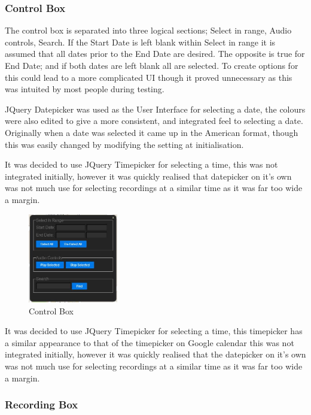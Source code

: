 \documentclass{l3proj}
\begin{document}
\subsubsection{Control Box}

The control box is separated into three logical sections; Select in range, Audio controls, Search. If the Start Date is left blank within Select in range it is assumed that all dates prior to the End Date are desired. The opposite is true for End Date; and if both dates are left blank all are selected. To create options for this could lead to a more complicated UI though it proved unnecessary as this was intuited by most people during testing.

JQuery Datepicker was used as the User Interface for selecting a date, the colours were also edited to give a more consistent, and integrated feel to selecting a date. Originally when a date was selected it came up in the American format, though this was easily changed by modifying the setting at initialisation.

It was decided to use JQuery Timepicker for selecting a time, this was not integrated initially, however it was quickly realised that datepicker on it's own was not much use for selecting recordings at a similar time as it was far too wide a margin.

\begin{figure}[ht!]
\centering
\includegraphics[width=0.35\textwidth]{images/ctrl-box.jpg}
\caption{Control Box}
\end{figure}

It was decided to use JQuery Timepicker for selecting a time, this timepicker has a similar appearance to that of the timepicker on Google calendar this was not integrated initially, however it was quickly realised that the datepicker on it's own was not much use for selecting recordings at a similar time as it was far too wide a margin.

\subsubsection{Recording Box}
\end{document}
